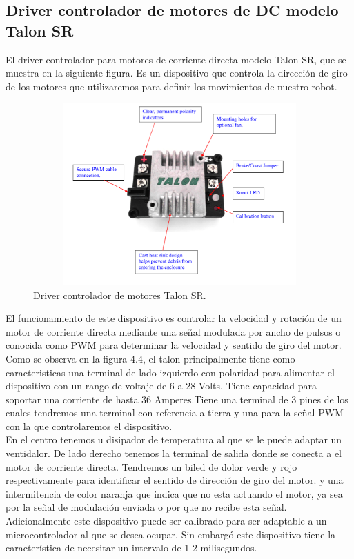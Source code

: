 \documentclass[12pt]{book} %
\begin{document}
\subsection{Driver controlador de motores de DC modelo Talon SR}
El driver controlador para motores de corriente directa modelo Talon SR, que se muestra en la siguiente figura. Es un dispositivo que controla la dirección de giro de los motores que utilizaremos para definir los movimientos de nuestro robot.\\
\begin{figure}[H]
	\begin{center}
	\includegraphics[width =16cm,height =7cm]{Talon.png}
	\caption{Driver controlador de motores Talon SR.} 
	\end{center}
\end{figure}
El funcionamiento de este dispositivo es controlar la velocidad y rotación de un motor de corriente directa mediante una señal modulada por ancho de pulsos o conocida como PWM para determinar la velocidad y sentido de giro del motor.\\
Como se observa en la figura 4.4, el talon principalmente tiene como caracteristicas una terminal de lado izquierdo con polaridad para alimentar el dispositivo con un rango de voltaje de 6 a 28 Volts. Tiene capacidad para soportar una corriente de hasta 36 Amperes.Tiene una terminal de 3 pines de los cuales tendremos una terminal con referencia a tierra y una para la señal PWM con la que controlaremos el dispositivo.\\
En el centro tenemos u disipador de temperatura al que se le puede adaptar un ventidalor. De lado derecho tenemos la terminal de salida donde se conecta a el motor de corriente directa. Tendremos un biled de dolor verde y rojo respectivamente para identificar el sentido de dirección de giro del motor. y una intermitencia de color naranja que indica que no esta actuando el motor, ya sea por la señal de modulación enviada o por que no recibe esta señal.\\
Adicionalmente este dispositivo puede ser calibrado para ser adaptable a un microcontrolador al que se desea ocupar. Sin embargó este dispositivo tiene la característica de necesitar un intervalo de 1-2 milisegundos.
\end{document}
